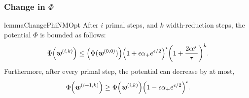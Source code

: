 \documentclass[11pt]{article}
\let\originalleft\left
\let\originalright\right
\renewcommand{\left}{\mathopen{}\mathclose\bgroup\originalleft}
\renewcommand{\right}{\aftergroup\egroup\originalright}
\newcommand\ww{\boldsymbol{\mathit{w}}}
\begin{document}
\subsubsection*{Change in $\Phi$}
\begin{restatable}{lemma}{ChangePhiNMOpt}
  \label{lem:ChangePhiNMOpt}
  After $i$ primal steps, and $k$ width-reduction steps,
  the potential $\Phi$ is bounded as follows:
  \begin{align*}
\Phi\left(\ww^{(i,k)}\right) \leq \left(\Phi(\ww^{(0,0)})\right)\left(1+\epsilon\alpha_+ e^{\epsilon/2}\right)^i\left(1 + \frac{2\epsilon e^{\epsilon}}{\tau}\right)^k.
 \end{align*}
 Furthermore, after every primal step, the potential can decrease by at most,
 \[
 \Phi\left(\ww^{(i+1,k)}\right) \geq  \Phi\left(\ww^{(i,k)}\right)\left(1-\epsilon\alpha_+ e^{\epsilon/2}\right)^i.  
 \]
\end{restatable}
\end{document}
